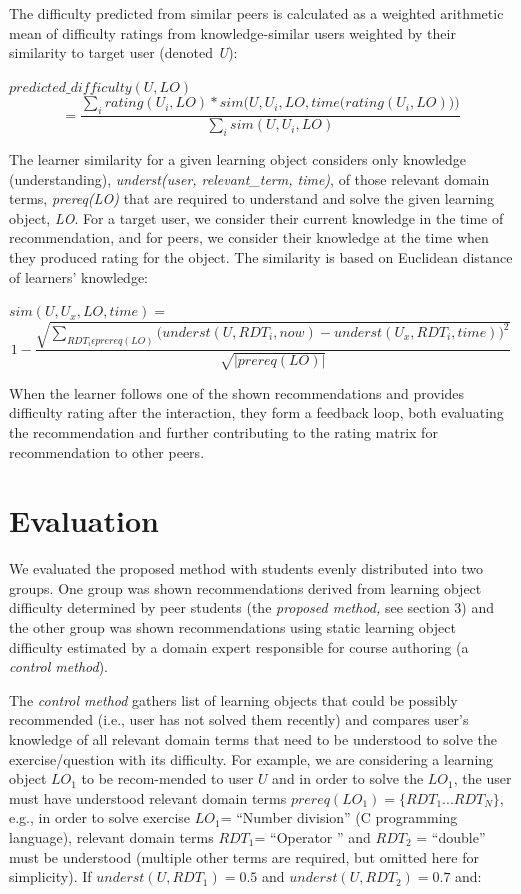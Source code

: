\documentclass{llncs}
\begin{document}
The difficulty predicted from similar peers is calculated as a weighted arithmetic mean of difficulty ratings from knowledge-similar users weighted by their similarity to target user (denoted \emph{U}):

$predicted\_difficulty (U,LO)$
$$=\frac{\sum_i rating (U_i, LO) * sim \Bigg(U, U_i, LO, time \Big(rating (U_i, LO)\Big)\Bigg)}{\sum_i sim (U, U_i, LO)}$$

The learner similarity for a given learning object considers only knowledge (understanding), \emph{underst(user, relevant\_term, time)}, of those relevant domain terms, \emph{prereq(LO)} that are required to understand and solve the given learning object, \emph{LO}. For a target user, we consider their current knowledge in the time of recommendation, and for peers, we consider their knowledge at the time when they produced rating for the object. The similarity is based on Euclidean distance of learners' knowledge:

$sim(U, U_x, LO, time) =$
$$1-\frac{\sqrt{\sum_{RDT_i\epsilon prereq(LO)}\Big(underst(U, RDT_i, now) - underst(U_x, RDT_i, time)\Big)^2}}{\sqrt{|prereq (LO)|}}$$

When the learner follows one of the shown recommendations and provides difficulty rating after the interaction, they form a feedback loop, both evaluating the recommendation and further contributing to the rating matrix for recommendation to other peers.

\section{Evaluation}
\label{sec4}

We evaluated the proposed method with students evenly distributed into two groups. One group was shown recommendations derived from learning object difficulty determined by peer students (the \emph{proposed method,} see section 3) and the other group was shown recommendations using static learning object difficulty estimated by a domain expert responsible for course authoring (a \emph{control method}).

The \emph{control method} gathers list of learning objects that could be possibly recommended (i.e., user has not solved them recently) and compares user's knowledge of all relevant domain terms that need to be understood to solve the exercise/question with its difficulty. For example, we are considering a learning object $LO_1$ to be recom-mended to user $U$ and in order to solve the $LO_1$, the user must have understood relevant domain terms $prereq(LO_1) = \{RDT_1 ...RDT_N\}$, e.g., in order to solve exercise $LO_1$= ``Number division'' (C programming language), relevant domain terms $RDT_1$= ``Operator \/'' and $RDT_2$ = ``double'' must be understood (multiple other terms are required, but omitted here for simplicity). If $underst(U, RDT_1) = 0.5$ and $underst(U, RDT_2) = 0.7$ and:
\end{document}
